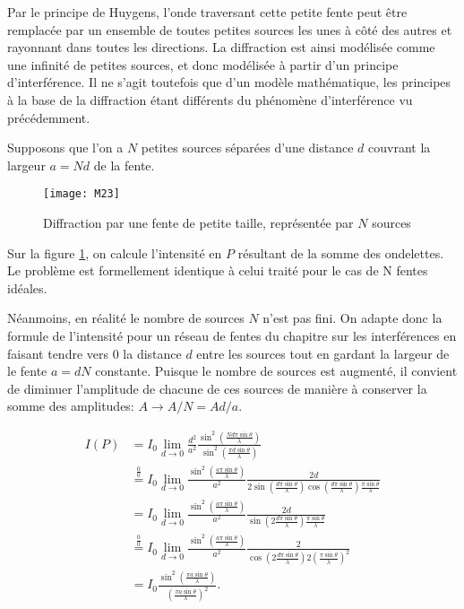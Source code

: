 Par le principe de Huygens, l'onde traversant cette petite fente peut être remplacée par un ensemble de toutes petites sources les unes à côté des autres et rayonnant dans toutes les directions. La diffraction est ainsi modélisée comme une infinité de petites sources, et donc modélisée à partir d'un principe d'interférence. Il ne s'agit toutefois que d'un modèle mathématique, les principes à la base de la diffraction étant différents du phénomène d'interférence vu précédemment.


Supposons que l'on a $N$ petites sources séparées d'une distance $d$ couvrant la largeur $a=Nd$ de la fente.

\begin{figure}[h]
    \centering
    \texttt{[image: M23]}
    \caption{Diffraction par une fente de petite taille, représentée par $N$ sources}
    \label{f2}
\end{figure}

\noindent Sur la figure \ref{f2}, on calcule l'intensité en $P$ résultant de la somme des ondelettes. Le problème est formellement identique à celui traité pour le cas de N fentes idéales.

\noindent Néanmoins, en réalité le nombre de sources $N$ n'est pas fini. On adapte donc la formule de l'intensité pour un réseau de fentes du chapitre sur les interférences en faisant tendre vers $0$ la distance $d$ entre les sources tout en gardant la largeur de le fente $a=dN$ constante. Puisque le nombre de sources est augmenté, il convient de diminuer l'amplitude de chacune de ces sources de manière à conserver la somme des amplitudes: $A \rightarrow A/N=Ad/a$.

\begin{align*}
I(P) & =I_0\lim_{d\to 0} \frac{d^2}{a^2}\frac{\sin^2(\frac{Nd\pi \sin\theta}{\lambda})}{\sin^2(\frac{\pi d\sin\theta}{\lambda})}\\
& \overset{\frac{0}{0}}{=} I_0\lim_{d\to 0} \frac{\sin^2(\frac{a\pi \sin\theta}{\lambda})}{a^2}\frac{2d}{2\sin(\frac{d\pi \sin\theta}{\lambda})\cos(\frac{d\pi \sin\theta}{\lambda})\frac{\pi \sin\theta}{\lambda}}\\
& =I_0 \lim_{d\to 0} \frac{\sin^2(\frac{a\pi \sin\theta}{\lambda})}{a^2}\frac{2d}{\sin(2\frac{d\pi \sin\theta}{\lambda})\frac{\pi \sin\theta}{\lambda}}\\
& \overset{\frac{0}{0}}{=}I_0 \lim_{d\to 0} \frac{\sin^2(\frac{a\pi \sin\theta}{\lambda})}{a^2}\frac{2}{\cos(2\frac{d\pi \sin\theta}{\lambda})2(\frac{\pi \sin\theta}{\lambda})^2}\\
& =I_0 \frac{\sin^2(\frac{\pi a \sin\theta}{\lambda})}{(\frac{\pi a \sin\theta}{\lambda})^2}.
\end{align*}

